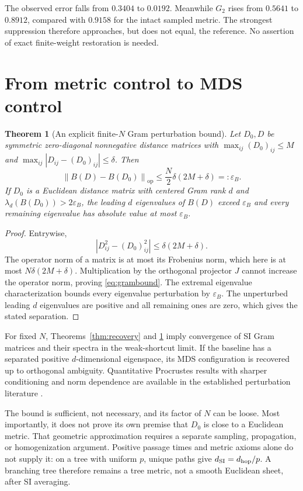 \documentclass[11pt,letterpaper]{article}
\newtheorem{theorem}{Theorem}[section]
\theoremstyle{definition}
\theoremstyle{remark}
\newcommand{\dSI}{d_{\mathrm{SI}}}
\newcommand{\specnorm}[1]{\left\lVert #1\right\rVert_{\mathrm{op}}}
\begin{document}
The observed error falls from $0.3404$ to $0.0192$. Meanwhile $G_2$ rises from $0.5641$ to $0.8912$, compared with $0.9158$ for the intact sampled metric. The strongest suppression therefore approaches, but does not equal, the reference. No assertion of exact finite-weight restoration is needed.

\section{From metric control to MDS control}\label{sec:perturbation}
\begin{theorem}[An explicit finite-$N$ Gram perturbation bound]\label{thm:perturbation}
Let $D_0,D$ be symmetric zero-diagonal nonnegative distance matrices with $\max_{ij}(D_0)_{ij}\leq M$ and $\max_{ij}|D_{ij}-(D_0)_{ij}|\leq\delta$. Then
\begin{equation}
 \specnorm{B(D)-B(D_0)}\leq
 \frac N2\delta(2M+\delta)=:\varepsilon_B.
 \label{eq:grambound}
\end{equation}
If $D_0$ is a Euclidean distance matrix with centered Gram rank $d$ and $\lambda_d(B(D_0))>2\varepsilon_B$, the leading $d$ eigenvalues of $B(D)$ exceed $\varepsilon_B$ and every remaining eigenvalue has absolute value at most $\varepsilon_B$.
\end{theorem}
\begin{proof}
Entrywise,
\begin{equation}
 |D_{ij}^2-(D_0)_{ij}^2|
 \leq\delta(2M+\delta).
\end{equation}
The operator norm of a matrix is at most its Frobenius norm, which here is at most $N\delta(2M+\delta)$. Multiplication by the orthogonal projector $J$ cannot increase the operator norm, proving \eqref{eq:grambound}. The extremal eigenvalue characterization bounds every eigenvalue perturbation by $\varepsilon_B$. The unperturbed leading $d$ eigenvalues are positive and all remaining ones are zero, which gives the stated separation.
\end{proof}

For fixed $N$, Theorems~\ref{thm:recovery} and \ref{thm:perturbation} imply convergence of SI Gram matrices and their spectra in the weak-shortcut limit. If the baseline has a separated positive $d$-dimensional eigenspace, its MDS configuration is recovered up to orthogonal ambiguity. Quantitative Procrustes results with sharper conditioning and norm dependence are available in the established perturbation literature \cite{arias2020}.

The bound is sufficient, not necessary, and its factor of $N$ can be loose. Most importantly, it does not prove its own premise that $D_0$ is close to a Euclidean metric. That geometric approximation requires a separate sampling, propagation, or homogenization argument. Positive passage times and metric axioms alone do not supply it: on a tree with uniform $p$, unique paths give $\dSI=d_{\rm hop}/p$. A branching tree therefore remains a tree metric, not a smooth Euclidean sheet, after SI averaging.
\end{document}
